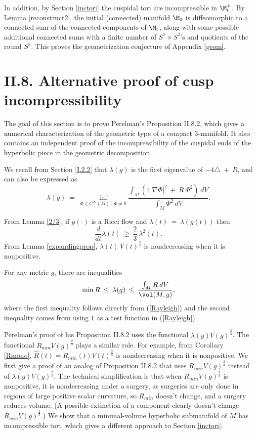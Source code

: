 In addition, by Section \ref{inctori}
the cuspidal tori are incompressible in $\M_t^+$.
By Lemma \ref{reconstruct2},
the initial (connected) manifold $\M_0$ is diffeomorphic to a connected sum of
the connected components of $\M_t$, along with some possible additional connected sums
with a finite number of $S^1 \times S^2$'s and quotients of the round $S^3$.
This proves the geometrization conjecture of Appendix \ref{geom}.

\section{II.8. Alternative proof of cusp incompressibility} \label{II.8}

The goal of this section is to prove Perelman's Proposition II.8.2, which
gives a numerical characterization of
the geometric type of a compact $3$-manifold. It also contains an
independent proof of the incompressibility of the cuspidal ends
of the hyperbolic piece in the geometric decomposition.

We recall from Section \ref{I.2.2}
that $\lambda(g)$ is the first eigenvalue of
$-4 \triangle \: + \: R$, and can also be expressed as
\begin{equation} \label{Rayleigh}
\lambda(g) \: = \: \inf_{\Phi \in C^\infty(M) \: : \:
\Phi \neq 0} \frac{\int_M \left( 4 |\nabla \Phi|^2 \: + \:
R \: \Phi^2 \right) \: dV}{\int_M \Phi^2 \: dV}.
\end{equation}

From Lemma \ref{2/3}, if $g(\cdot)$ is a Ricci flow and
$\lambda(t) \: = \: \lambda(g(t))$ then
\begin{equation} \label{ll}
\frac{d}{dt} \lambda(t) \: \ge \: \frac23 \:
\lambda^2(t).
\end{equation}
From Lemma \ref{expandingprop},
$\lambda(t) \: V(t)^{\frac23}$ is nondecreasing
when it is nonpositive.

For any metric $g$, there are inequalities
\begin{equation} \label{test}
\min R \: \le \: \lambda(g) \: \le \: \frac{\int_M R \: dV}{\vol(M, g)},
\end{equation}
where the first inequality follows directly from (\ref{Rayleigh})
and the second inequality comes from using $1$ as a
test function in (\ref{Rayleigh}).


Perelman's proof of his Proposition II.8.2 uses the functional
$\lambda(g) V(g)^{\frac23}$. The functional
$R_{min} V(g)^{\frac23}$ plays a similar role.  For example, from
Corollary \ref{Rmono},
$\widehat{R}(t) = R_{min}(t) V(t)^{\frac23}$ is nondecreasing
when it is nonpositive. We first give a proof of an analog of
Proposition II.8.2 that uses $R_{min} V(g)^{\frac23}$ instead
of $\lambda(g) V(g)^{\frac23}$. The technical simplification is that
when
$R_{min} V(g)^{\frac23}$ is nonpositive, it is nondecreasing under a surgery,
as surgeries are only done in regions of large positive scalar curvature,
so $R_{min}$ doesn't change,
and a surgery reduces volume. (A possible extinction of a component
clearly doesn't change $R_{min} V(g)^{\frac23}$.)
We show that a minimal-volume hyperbolic submanifold of $M$
has incompressible tori, which gives a different approach to
Section \ref{inctori}.

